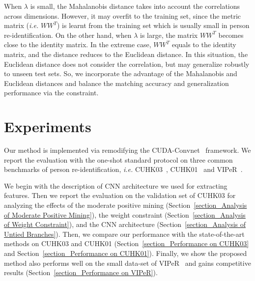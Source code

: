 \documentclass[runningheads]{llncs}
\begin{document}
When $\lambda$ is small, the Mahalanobis distance takes into account the correlations across dimensions.
However, it may overfit to the training set, since the metric matrix (\emph{i.e.} $WW^T$) is learnt from the training set which is usually small in person re-identification.
On the other hand, when $\lambda$ is large, the matrix $WW^T$ becomes close to the identity matrix.
In the extreme case, $WW^T$ equals to the identity matrix, and the distance
reduces to the Euclidean distance.
In this situation, the Euclidean distance does not consider the correlation, but may generalize robustly to unseen test sets.
So, we incorporate the advantage of the Mahalanobis and Euclidean distances and balance the matching accuracy and generalization performance via the constraint.












\section{Experiments}
\label{section_Experiments}

Our method is implemented via remodifying the CUDA-Convnet~\cite{krizhevsky2012imagenet} framework.
We report the evaluation with the one-shot standard protocol on three common benchmarks of person re-identification, \emph{i.e.} CUHK03~\cite{li2014deepreid}, CUHK01~\cite{li2012human} and VIPeR~\cite{gray2007evaluating}.

We begin with the description of CNN architecture we used for extracting features.
Then we report the evaluation on the validation set of CUHK03 for analyzing the effects of the moderate positive mining (Section~\ref{section_Analysis of Moderate Positive Mining}), the weight constraint (Section~\ref{section_Analysis of Weight Constraint}), and the CNN architecture (Section~\ref{section_Analysis of Untied Branches}).
Then, we compare our performance with the state-of-the-art methods on CUHK03 and CUHK01 (Section~\ref{section_Performance on CUHK03} and Section~\ref{section_Performance on CUHK01}).
Finally, we show the proposed method also performs well on the small data-set of VIPeR~\cite{gray2007evaluating} and gains competitive results (Section~\ref{section_Performance on VIPeR}).
\end{document}
